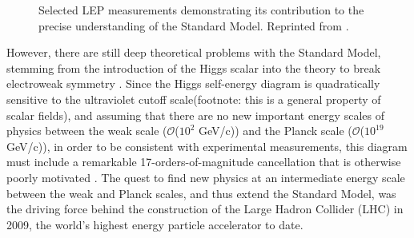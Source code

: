 \documentclass[12pt, letterpaper]{report}
\begin{document}
\begin{figure}
	\label{fig:LEP}
	\caption{Selected LEP measurements demonstrating its contribution to the precise understanding of the Standard Model.  Reprinted from \cite{Drees}.}
\end{figure}

However, there are still deep theoretical problems with the Standard Model, stemming from the introduction of the Higgs scalar into the theory to break electroweak symmetry \cite{Higgs}.  Since the Higgs self-energy diagram is quadratically sensitive to the ultraviolet cutoff scale(footnote: this is a general property of scalar fields), and assuming that there are no new important energy scales of physics between the weak scale ($\mathcal{O}$($10^{2}$ GeV/c)) and the Planck scale ($\mathcal{O}$($10^{19}$ GeV/c)), in order to be consistent with experimental measurements, this diagram must include a remarkable 17-orders-of-magnitude cancellation that is otherwise poorly motivated \cite{Aitchison}.  The quest to find new physics at an intermediate energy scale between the weak and Planck scales, and thus extend the Standard Model, was the driving force behind the construction of the Large Hadron Collider (LHC) in 2009, the world's highest energy particle accelerator to date.
\end{document}
